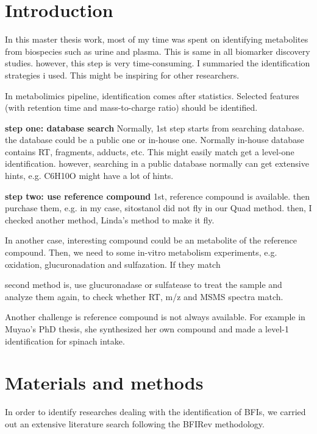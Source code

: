 \section{Introduction}
In this master thesis work, most of my time was spent on identifying metabolites from biospecies such as urine and plasma. This is same in all biomarker discovery studies. however, this step is very time-consuming. I summaried the identification strategies i used. This might be inspiring for other researchers.

In metabolimics pipeline, identification comes after statistics. Selected features (with retention time and mass-to-charge ratio) should be identified. 

\textbf{step one: database search}
Normally, 1st step starts from searching database. the database could be a public one or in-house one. Normally in-house database contains RT, fragments, adducts, etc. This might easily match get a level-one identification.
however, searching in a public database normally can get extensive hints, e.g. C6H10O might have a lot of hints.

\textbf{step two: use reference compound}
1st, reference compound is available. then purchase them, e.g. in my case, sitostanol did not fly in our Quad method. then, I checked another method, Linda's method to make it fly.

In another case, interesting compound could be an metabolite of the reference compound. Then, we need to some in-vitro metabolism experiments, e.g. oxidation, glucuronadation and sulfazation. If they match 

second method is, use glucuronadase or sulfatease to treat the sample and analyze them again, to check whether RT, m/z and MSMS spectra match.

Another challenge is reference compound is not always available. For example in Muyao's PhD thesis, she synthesized her own compound and made a level-1 identification for spinach intake.

\section{Materials and methods}
In order to identify researches dealing with the identification of BFIs, we carried out an extensive literature search following the BFIRev methodology\cite{Pratico2018}.

